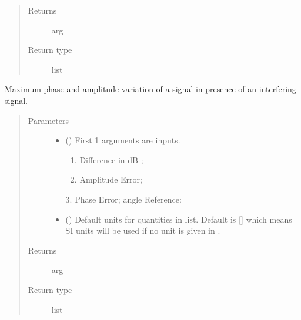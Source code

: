 \documentclass[letterpaper,10pt,english]{sphinxmanual}
\begin{document}
\begin{fulllineitems}
\begin{quote}
\begin{description}
\begin{itemize}
\end{itemize}

\item[{Returns}] \leavevmode
arg

\item[{Return type}] \leavevmode
list

\end{description}\end{quote}

\end{fulllineitems}


\begin{fulllineitems}
\label{\detokenize{components:components.Interference_Phase_Amp_Error}}
Maximum phase and amplitude variation of a signal in presence of an interfering signal.
\begin{quote}\begin{description}
\item[{Parameters}] \leavevmode\begin{itemize}
\item {} 
 () \textendash{} 
First 1 arguments are inputs.
\begin{enumerate}
%
\item {} 
Difference in dB ;

\item {} 
Amplitude Error;

\end{enumerate}

3. Phase Error; angle
Reference:


\item {} 
 (\sphinxstyleliteralemphasis{\sphinxupquote{, }}) \textendash{} Default units for quantities in  list. Default is {[}{]} which means SI units will be used if no unit is given in .

\end{itemize}

\item[{Returns}] \leavevmode
arg

\item[{Return type}] \leavevmode
list

\end{description}\end{quote}

\end{fulllineitems}
\end{document}
